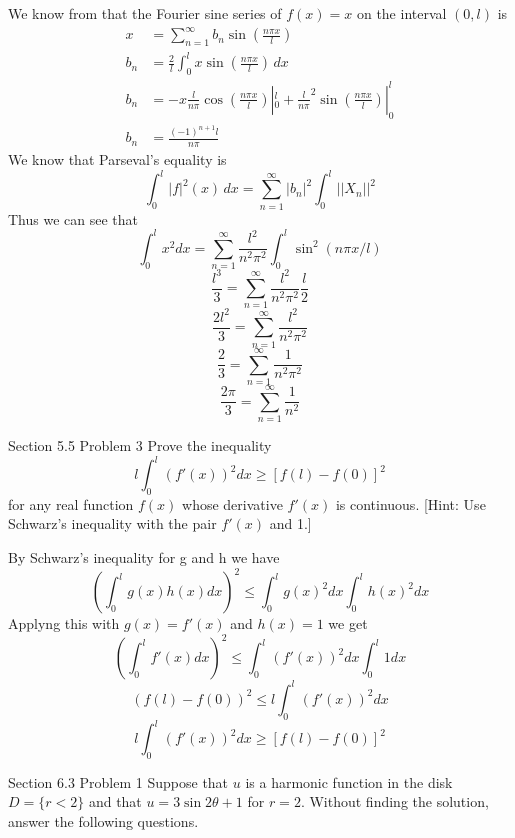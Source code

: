 \documentclass[answers,12pt,addpoints]{exam}
\begin{document}
\begin{questions}
    \begin{solution}
        We know from that the Fourier sine series of $f(x) = x$ on the interval $(0, l)$ is
        \begin{align*}
            x &= \sum_{n=1}^{\infty} b_n \sin \left( \frac{n\pi x}{l} \right)\\
            b_n &= \frac{2}{l} \int_{0}^{l} x \sin \left( \frac{n\pi x}{l} \right) \, dx\\
            b_n &= -x \frac{l}{n\pi} \cos \left( \frac{n\pi x}{l} \right) |_{0}^{l} + \frac{l}{n\pi}^2 \sin(\frac{n\pi x}{l})|_{0}^{l}\\ 
            b_n &= \frac{(-1)^{n+1}l}{n\pi}
        \end{align*}
        We know that Parseval's equality is
        \[
        \int_{0}^{l} |f|^2(x) \, dx = \sum_{n=1}^{\infty} |b_n|^2 \int_0^l||X_n||^2
        \]
        Thus we can see that
        $$ \int_{0}^{l} x^2 dx = \sum_{n=1}^{\infty} \frac{l^2}{n^2 \pi^2} \int_0^l \sin^2(n\pi x/ l)$$
        $$ \frac{l^3}{3} = \sum_{n=1}^{\infty} \frac{l^2}{n^2 \pi^2} \frac{l}{2}$$
        $$ \frac{2l^2}{3} = \sum_{n=1}^{\infty} \frac{l^2}{n^2 \pi^2}$$
        $$ \frac{2}{3} = \sum_{n=1}^{\infty} \frac{1}{n^2 \pi^2}$$
        $$ \frac{2\pi}{3} = \sum_{n=1}^{\infty} \frac{1}{n^2}$$
    \end{solution}

    \question[10] Section 5.5 Problem 3
    Prove the inequality 
    \[
    l\int_0^l (f'(x))^2 dx \geq [f(l) - f(0)]^2
    \]
    for any real function \( f(x) \) whose derivative \( f'(x) \) is continuous. 
    [Hint: Use Schwarz's inequality with the pair \( f'(x) \) and 1.] 
    \begin{solution}
        By Schwarz's inequality for g and h we have
        $$ (\int_0^l g(x)h(x) dx)^2 \leq \int_0^l g(x)^2 dx \int_0^l h(x)^2 dx$$
        Applyng this with $g(x) = f'(x)$ and $h(x) = 1$ we get
        $$ (\int_0^l f'(x) dx)^2 \leq \int_0^l (f'(x))^2 dx \int_0^l 1 dx$$
        $$ (f(l) - f(0))^2 \leq l \int_0^l (f'(x))^2 dx$$
        $$ l\int_0^l (f'(x))^2 dx \geq [f(l) - f(0)]^2$$
    \end{solution}
    
    \question[10] Section 6.3 Problem 1
    Suppose that \( u \) is a harmonic function in the disk \( D = \{r < 2\} \) and that \( u = 3 \sin 2\theta + 1 \) for \( r = 2 \). Without finding the solution, answer the following questions.
\end{questions}
\end{document}
